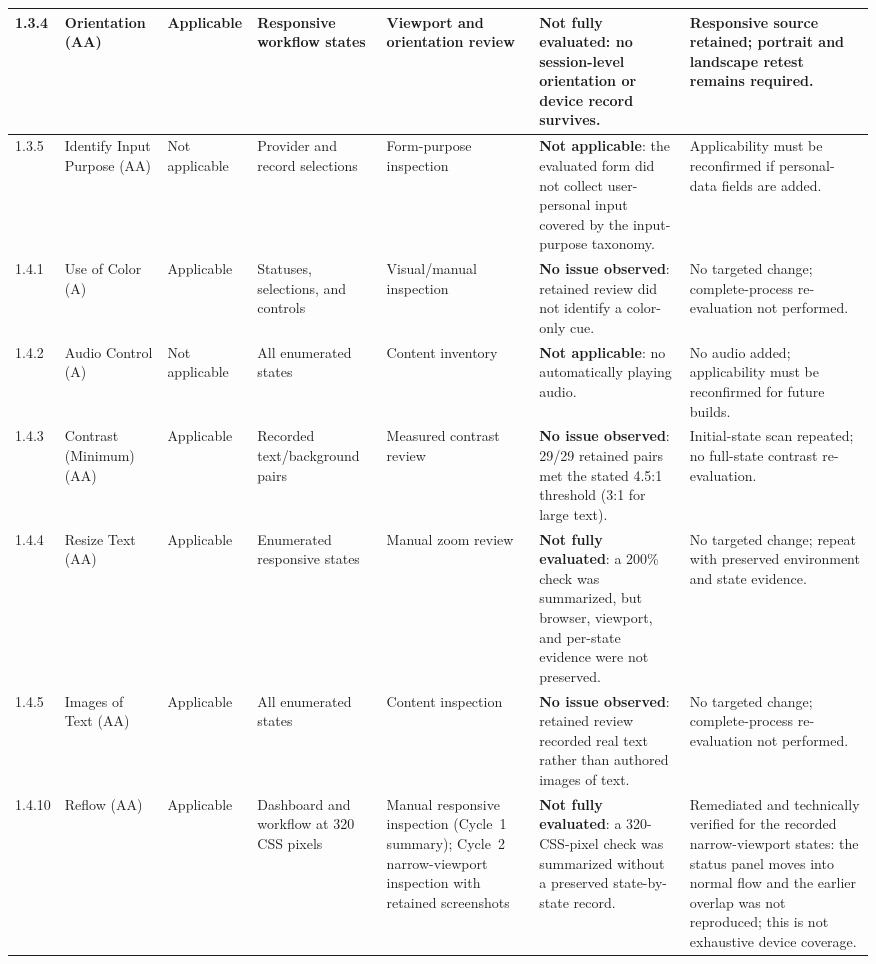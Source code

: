 \documentclass[10pt]{article}
\begin{document}
\begin{landscape}
{\begin{longtable}{|p{1.0cm}|p{3.3cm}|p{1.9cm}|p{2.7cm}|p{2.5cm}|p{4.1cm}|p{4.1cm}|}
1.3.4 & Orientation (AA) & Applicable & Responsive workflow states & Viewport and orientation review & \textbf{Not fully evaluated}: no session-level orientation or device record survives. & Responsive source retained; portrait and landscape retest remains required.\\\hline
1.3.5 & Identify Input Purpose (AA) & Not applicable & Provider and record selections & Form-purpose inspection & \textbf{Not applicable}: the evaluated form did not collect user-personal input covered by the input-purpose taxonomy. & Applicability must be reconfirmed if personal-data fields are added.\\\hline
1.4.1 & Use of Color (A) & Applicable & Statuses, selections, and controls & Visual/manual inspection & \textbf{No issue observed}: retained review did not identify a color-only cue. & No targeted change; complete-process re-evaluation not performed.\\\hline
1.4.2 & Audio Control (A) & Not applicable & All enumerated states & Content inventory & \textbf{Not applicable}: no automatically playing audio. & No audio added; applicability must be reconfirmed for future builds.\\\hline
1.4.3 & Contrast (Minimum) (AA) & Applicable & Recorded text/background pairs & Measured contrast review & \textbf{No issue observed}: 29/29 retained pairs met the stated 4.5:1 threshold (3:1 for large text). & Initial-state scan repeated; no full-state contrast re-evaluation.\\\hline
1.4.4 & Resize Text (AA) & Applicable & Enumerated responsive states & Manual zoom review & \textbf{Not fully evaluated}: a 200\% check was summarized, but browser, viewport, and per-state evidence were not preserved. & No targeted change; repeat with preserved environment and state evidence.\\\hline
1.4.5 & Images of Text (AA) & Applicable & All enumerated states & Content inspection & \textbf{No issue observed}: retained review recorded real text rather than authored images of text. & No targeted change; complete-process re-evaluation not performed.\\\hline
1.4.10 & Reflow (AA) & Applicable & Dashboard and workflow at 320 CSS pixels & Manual responsive inspection (Cycle~1 summary); Cycle~2 narrow-viewport inspection with retained screenshots & \textbf{Not fully evaluated}: a 320-CSS-pixel check was summarized without a preserved state-by-state record. & Remediated and technically verified for the recorded narrow-viewport states: the status panel moves into normal flow and the earlier overlap was not reproduced; this is not exhaustive device coverage.\\\hline

\end{longtable}}
\end{landscape}
\end{document}
